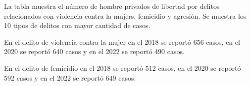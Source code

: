 La tabla muestra el número de hombre privados de libertad por delitos relacionados con violencia contra la mujers, femicidio y agresión. Se muestra los 10 tipos de delitos con mayor cantidad de casos. 

En el delito de violencia contra la mujer en el 2018 se reportó 656 casos, en el 2020 se reportó 640 casos y en el 2022 se reportó 490 casos. 

En el delito de femicidio en el 2018 se reportó 512 casos, en el 2020 se reportó 592 casos y en el 2022 se reportó 649 casos. 
